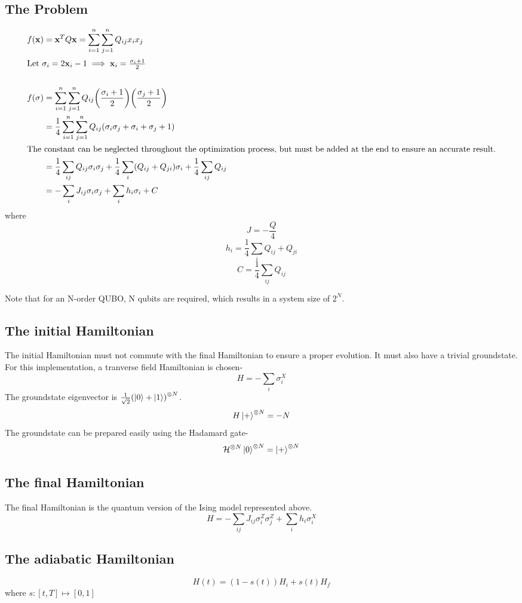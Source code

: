 \documentclass{article}
\begin{document}
\subsection{The Problem}
\begin{align}
    f(\mathbf x) &= \mathbf x^T Q \mathbf x = \sum_{i=1}^n\sum_{j=1}^n{Q_{ij}x_ix_j} \\ 
    \intertext{Let $\sigma_i = 2\mathbf x_i - 1 \implies \mathbf x_i = \frac{\sigma_i + 1}{2}$ }  \\ 
    f(\mathbf \sigma) &= \sum_{i=1}^n \sum_{j=1}^n Q_{ij}\pqty{\frac{\sigma_i + 1}{2}}\pqty{\frac{\sigma_j + 1}{2}} \\ 
    &= \frac14\sum_{i=1}^n\sum_{j=1}^n Q_{ij}(\sigma_i\sigma_j + \sigma_i + \sigma_j + 1) \\ 
    \intertext{The constant can be neglected throughout the optimization process, but must be added at the end to ensure an accurate result.}
    &= \frac14 \sum_{ij}Q_{ij}\sigma_i\sigma_j + \frac14 \sum_i (Q_{ij}+Q_{ji})\sigma_i + \frac14\sum_{ij} Q_{ij} \\ 
    &= -\sum_{i} {J_{ij}\sigma_i\sigma_j} + \sum_{i}h_i \sigma_i + C 
\end{align}
 where $$J = -\frac{Q}{4}$$ $$h_i = \frac14 \sum_i {Q_{ij} + Q_{ji}}$$ $$C = \frac14 \sum_{ij}{Q_{ij}}$$

Note that for an N-order QUBO, N qubits are required, which results in a system size of $2^N$.
\subsection{The initial Hamiltonian}
The initial Hamiltonian must not commute with the final Hamiltonian to ensure a proper evolution. It must also have a trivial groundstate. For this implementation, 
a tranverse field Hamiltonian is chosen- 
$$H = -\sum_{i}\sigma_i^X$$
The groundstate eigenvector is $\frac{1}{\sqrt 2}\pqty{\ket 0 + \ket 1}^{\otimes N}$. 
$$H \ket +^{\otimes N} = -N$$
The groundstate can be prepared easily using the Hadamard gate- 
$$\mathcal H ^{\otimes N}\ket 0^{\otimes N} = \ket + ^{\otimes N}$$

\subsection{The final Hamiltonian}
The final Hamiltonian is the quantum version of the Ising model represented above. 
$$H = - \sum_{ij} J_{ij}\sigma_i^Z\sigma_j^Z + \sum_i h_i \sigma_i^X$$
\subsection{The adiabatic Hamiltonian}
$$H(t) =  (1-s(t))H_i + s(t)H_f$$
where $s : [t, T] \mapsto [0,1]$ 
\end{document}
